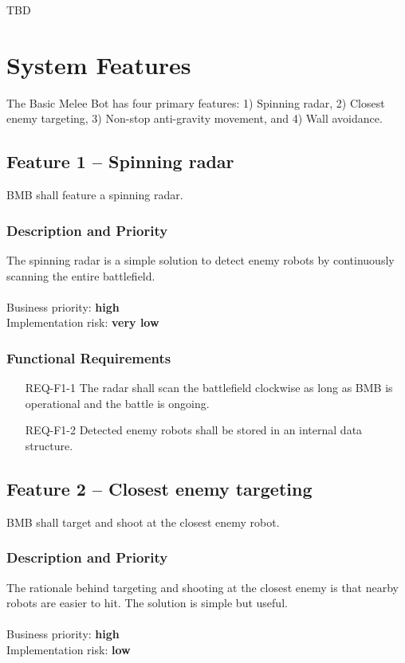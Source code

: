 \documentclass{scrreprt}
\begin{document}
TBD

\chapter{System Features}
The Basic Melee Bot has four primary features: 1) Spinning radar, 2) Closest enemy targeting, 3) Non-stop anti-gravity movement, and 4) Wall avoidance.

\section{Feature 1 -- Spinning radar}
BMB shall feature a spinning radar.

\subsection{Description and Priority}
The spinning radar is a simple solution to detect enemy robots by continuously scanning the entire battlefield.\\\\Business priority: \textbf{high}\\
Implementation risk: \textbf{very low}

\subsection{Functional Requirements}
\begin{itemize}
\item[REQ-F1-1] The radar shall scan the battlefield clockwise as long as BMB is operational and the battle is ongoing.
\item[REQ-F1-2] Detected enemy robots shall be stored in an internal data structure. 
\end{itemize}

\section{Feature 2 -- Closest enemy targeting}
BMB shall target and shoot at the closest enemy robot.

\subsection{Description and Priority}
The rationale behind targeting and shooting at the closest enemy is that nearby robots are easier to hit. The solution is simple but useful.\\\\Business priority: \textbf{high}\\
Implementation risk: \textbf{low}
\end{document}
